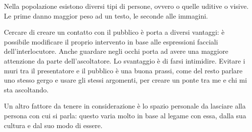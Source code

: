 Nella popolazione esistono diversi tipi di persone, ovvero o quelle uditive o
visive. Le prime danno maggior peso ad un testo, le seconde alle immagini.

Cercare di creare un contatto con il pubblico è porta a diversi vantaggi: è
possibile modificare il proprio intervento in base alle espressioni facciali
dell'interlocutore. Anche guardare negli occhi porta ad avere una maggiore
attenzione da parte dell'ascoltatore. Lo svantaggio è di farsi intimidire.
Evitare i muri tra il presentatore e il pubblico è una buona prassi, come del
resto parlare uno stesso gergo e usare gli stessi argomenti, per creare un
ponte tra me e chi mi sta ascoltando.

Un altro fattore da tenere in considerazione è lo spazio personale da lasciare
alla persona con cui si parla: questo varia molto in base al legame con essa,
dalla sua cultura e dal suo modo di essere.
